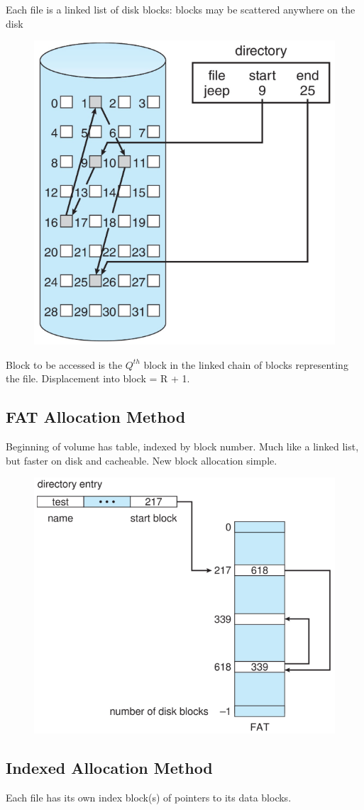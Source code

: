 \newpage
Each file is a linked list of disk blocks: blocks may be scattered
anywhere on the disk

\begin{figure}[h!]
    \centering
    \includegraphics[width=0.4\linewidth]{img/srfymjkgm.png}
\end{figure}

Block to be accessed is the $Q^{th}$ block in the linked chain of
blocks representing the file. Displacement into block = R + 1.

\subsection{FAT Allocation Method}

Beginning of volume has table, indexed by block number. Much like a linked list, but faster on disk and cacheable. New block allocation simple.

\begin{figure}[h!]
    \centering
    \includegraphics[width=0.5\linewidth]{img/nddgndg.png}
\end{figure}

\newpage
\subsection{Indexed Allocation Method}

Each file has its own index block(s) of pointers to its data blocks.

